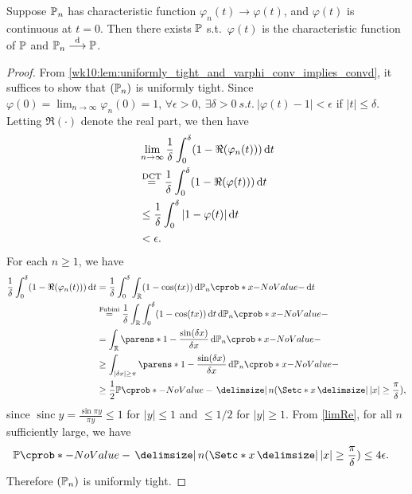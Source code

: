 \documentclass[12pt]{article}
\begin{document}
\begin{Theorem}\label{wk10:thm:Levy's Continuity Theorem}
Suppose $\P_n$ has characteristic function $\varphi_n(t)\to \varphi(t)$, and $\varphi(t)$ is continuous at $t=0$. Then there exists $\P$ s.t.\ $\varphi(t)$ is the characteristic function of $\P$ and $\P_n\convd \P$.
\end{Theorem}
\begin{proof}
From \cref{wk10:lem:uniformly_tight_and_varphi_conv_implies_convd}, it suffices to show that $(\P_n)$ is uniformly tight. Since $\varphi(0) =\lim_{n\to \infty} \varphi_n(0)=1$, $\forall \epsilon >0,\ \exists \delta>0 \ s.t.\ |\varphi(t)-1|<\epsilon$ if $|t|\leq\delta$. Letting $\Re(\cdot)$ denote the real part, we then have
\begin{align}
& \lim_{n\to \infty} \frac{1}{\delta} \int _{0}^{\delta} (1-\Re(\varphi_n(t))) \,\mathrm{d} t\nonumber\\ 
& \overset{\text{DCT}}{=} \frac{1}{\delta} \int _{0}^{\delta} (1-\Re(\varphi(t))) \,\mathrm{d} t\nonumber\\ 
& \leq \frac{1}{\delta} \int _{0}^{\delta} |1-\varphi(t)| \,\mathrm{d} t\nonumber\\ 
& <\epsilon.\label{limRe}
\end{align}
For each $n\geq1$, we have
\begin{align*}
\frac{1}{\delta} \int _{0}^{\delta} (1-\Re (\varphi_n(t))) \ud t 	
&=\frac{1}{\delta} \int _{0}^{\delta} \int_{\Real} (1-\cos(tx)) \ud \P_n(x) \ud t\\
&\overset{\text{Fubini}}{=}  \frac{1}{\delta}  \int_{\Real} \int _{0}^{\delta} (1-\cos(tx)) \ud t \ud \P_n(x) \\
& = \int _{\Real}\parens*{1-\frac{\sin (\delta x)}{\delta x}} \ud \P_n(x)\\
& \geq \int_{|\delta x|\geq \pi}\parens*{1-\frac{\sin (\delta x)}{\delta x}} \ud \P_n(x)\\
& \geq \frac{1}{2} \P{n}(\set*{x\given |x| \geq \frac{\pi}{\delta}}),
\end{align*}
since $\operatorname{sinc} y = \frac{\sin \pi y}{\pi y} \leq 1$ for $|y| \leq 1$ and $\leq 1/2$ for $|y| \geq 1$. From \cref{limRe}, for all $n$ sufficiently large, we have
\begin{align*}
& \P{n}(\set*{x\given |x| \geq \frac{\pi}{\delta}}) \leq 4 \epsilon.
\end{align*}
Therefore $(\P_n)$ is uniformly tight.
\end{proof}
\end{document}

